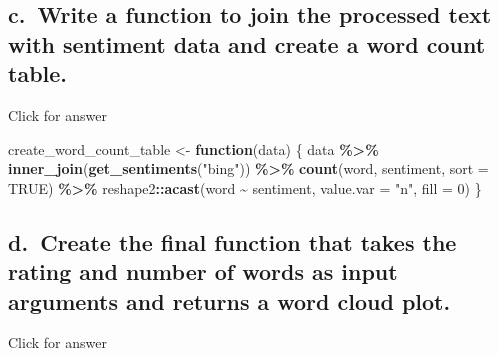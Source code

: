 \documentclass[
]{book}
\newenvironment{Shaded}{\begin{snugshade}}{\end{snugshade}}
\newcommand{\AttributeTok}[1]{\textcolor[rgb]{0.13,0.29,0.53}{#1}}
\newcommand{\ConstantTok}[1]{\textcolor[rgb]{0.56,0.35,0.01}{#1}}
\newcommand{\ControlFlowTok}[1]{\textcolor[rgb]{0.13,0.29,0.53}{\textbf{#1}}}
\newcommand{\DecValTok}[1]{\textcolor[rgb]{0.00,0.00,0.81}{#1}}
\newcommand{\FunctionTok}[1]{\textcolor[rgb]{0.13,0.29,0.53}{\textbf{#1}}}
\newcommand{\NormalTok}[1]{#1}
\newcommand{\OtherTok}[1]{\textcolor[rgb]{0.56,0.35,0.01}{#1}}
\newcommand{\SpecialCharTok}[1]{\textcolor[rgb]{0.81,0.36,0.00}{\textbf{#1}}}
\newcommand{\StringTok}[1]{\textcolor[rgb]{0.31,0.60,0.02}{#1}}
\begin{document}
\hypertarget{c.-write-a-function-to-join-the-processed-text-with-sentiment-data-and-create-a-word-count-table.}{%
\subsection{c.~Write a function to join the processed text with sentiment data and create a word count table.}\label{c.-write-a-function-to-join-the-processed-text-with-sentiment-data-and-create-a-word-count-table.}}

Click for answer

\begin{Shaded}
\begin{Highlighting}[]
\NormalTok{create\_word\_count\_table }\OtherTok{\textless{}{-}} \ControlFlowTok{function}\NormalTok{(data) \{}
\NormalTok{  data }\SpecialCharTok{\%\textgreater{}\%}
    \FunctionTok{inner\_join}\NormalTok{(}\FunctionTok{get\_sentiments}\NormalTok{(}\StringTok{"bing"}\NormalTok{)) }\SpecialCharTok{\%\textgreater{}\%}
    \FunctionTok{count}\NormalTok{(word, sentiment, }\AttributeTok{sort =} \ConstantTok{TRUE}\NormalTok{) }\SpecialCharTok{\%\textgreater{}\%}
\NormalTok{    reshape2}\SpecialCharTok{::}\FunctionTok{acast}\NormalTok{(word }\SpecialCharTok{\textasciitilde{}}\NormalTok{ sentiment, }\AttributeTok{value.var =} \StringTok{"n"}\NormalTok{, }\AttributeTok{fill =} \DecValTok{0}\NormalTok{)}
\NormalTok{\}}
\end{Highlighting}
\end{Shaded}

\hypertarget{d.-create-the-final-function-that-takes-the-rating-and-number-of-words-as-input-arguments-and-returns-a-word-cloud-plot.}{%
\subsection{d.~Create the final function that takes the rating and number of words as input arguments and returns a word cloud plot.}\label{d.-create-the-final-function-that-takes-the-rating-and-number-of-words-as-input-arguments-and-returns-a-word-cloud-plot.}}

Click for answer
\end{document}
